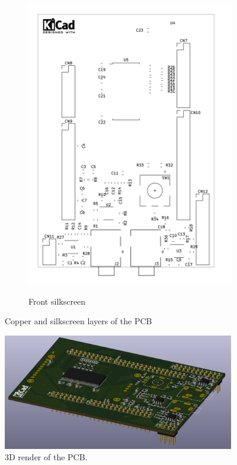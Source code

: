 \documentclass[a4paper,twoside,12pt]{book}
\begin{document}
\begin{figure}[H]
\begin{subfigure}[h]{0.3\textwidth}
        \includegraphics[width=\textwidth]{images/Board_silkscreen}
        \label{fig:board3}
        \caption{Front silkscreen}
    \end{subfigure}
    \caption{Copper and silkscreen layers of the PCB}
    \label{fig:board}
\end{figure}

\begin{figure}[H]
    \centering
    \includegraphics[width=0.9\textwidth]{images/PCB3D}
    \caption{3D render of the PCB.}
    \label{fig:pcb3d}
\end{figure}
\end{document}
